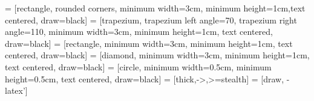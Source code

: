 \RequirePackage{listings}

\RequirePackage{tikz, tikz-cd}      %

\usetikzlibrary{shapes.geometric, arrows}
 = [rectangle, rounded corners, minimum width=3cm, minimum height=1cm,text centered, draw=black]
 = [trapezium, trapezium left angle=70, trapezium right angle=110, minimum width=3cm, minimum height=1cm, text centered, draw=black]
 = [rectangle, minimum width=3cm, minimum height=1cm, text centered, draw=black]
 = [diamond, minimum width=3cm, minimum height=1cm, text centered, draw=black]
 = [circle, minimum width=0.5cm, minimum height=0.5cm, text centered, draw=black]
 = [thick,->,>=stealth]
 = [draw, -latex']


\RequirePackage{caption}
\captionsetup[lstlisting]{format=listing,labelfont=white,textfont=white}

\renewcommand{\lstlistingname}{Código}


